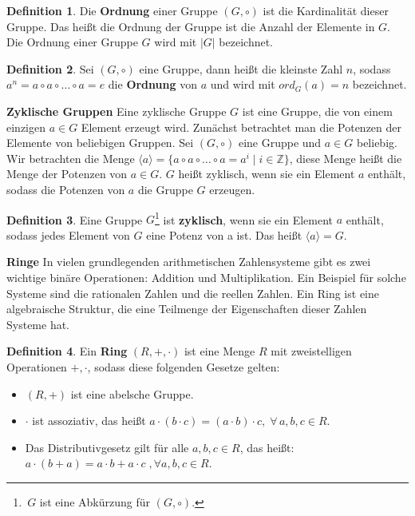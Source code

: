 \documentclass[12pt,oneside]{article}
\theoremstyle{remark}
\theoremstyle{definition}
\newtheorem{definition}{Definition}[section]
\begin{document}
\begin{definition}
Die \textbf{Ordnung} einer Gruppe $(G, \circ)$ ist die Kardinalität dieser Gruppe. Das heißt die Ordnung der Gruppe ist die Anzahl der Elemente in $G$. Die Ordnung einer Gruppe $G$ wird mit $|G|$ bezeichnet. 
\end{definition}

\begin{definition}
Sei $(G,\circ)$ eine Gruppe, dann heißt die kleinste Zahl $n$, sodass $a^n = a \circ a \circ \dots \circ a = e$ die \textbf{Ordnung} von $a$ und wird mit $ord_{G}(a) = n $ bezeichnet.
\end{definition}



\smallskip

\textbf{Zyklische Gruppen}\newline
Eine zyklische Gruppe $G$ ist eine Gruppe, die von einem einzigen $a \in G$ Element erzeugt wird. Zunächst betrachtet man die Potenzen der Elemente von beliebigen Gruppen. Sei $(G,\circ)$ eine Gruppe und $a \in G$ beliebig. Wir betrachten die Menge $\langle a \rangle = \{ a \circ a \circ \dots \circ a =  a^i \mid i \in \mathbb{Z}\}$, diese Menge heißt die Menge der Potenzen von $a \in G$. $G$ heißt zyklisch, wenn sie ein Element $a$ enthält, sodass die Potenzen von $a$ die Gruppe $G$ erzeugen. 

\begin{definition}
Eine Gruppe $G$\footnote{$\, G $ ist eine Abkürzung für $(G,\circ)$.} ist \textbf{zyklisch}, wenn sie ein Element $a$ enthält, sodass jedes Element von $G$ eine Potenz von a ist. Das heißt $\langle a \rangle = G$.
\end{definition}

\smallskip

\textbf{Ringe}\newline
In vielen grundlegenden arithmetischen Zahlensysteme gibt es zwei wichtige binäre Operationen: Addition und Multiplikation. Ein Beispiel für solche Systeme sind die rationalen Zahlen und die reellen Zahlen. Ein Ring ist eine algebraische Struktur, die eine Teilmenge der Eigenschaften dieser Zahlen Systeme hat.

\begin{definition}
Ein \textbf{Ring} $(R,+,\cdot)$ ist eine Menge $R$ mit zweistelligen Operationen $+, \cdot$, sodass diese folgenden Gesetze gelten:
\begin{itemize}
    \item $(R,+)$ ist eine abelsche Gruppe.
    \item $\cdot$ ist assoziativ, das heißt $a \cdot (b \cdot c) = (a \cdot b) \cdot c, \; \forall \, a,b,c \in R $. 
    \item Das Distributivgesetz gilt für alle $a,b,c \in R$, das heißt: $a \cdot (b + a) = a \cdot b + a \cdot c \; ,\forall a,b,c \in R$.
\end{itemize}
\end{definition}
\end{document}
